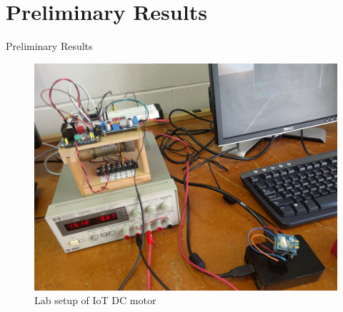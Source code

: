 \documentclass{beamer}
\begin{document}
\section{Preliminary Results}
\begin{frame}{Preliminary Results}
\begin{figure}
\includegraphics[scale=0.05]{../figs/motorSetup.jpg}
\caption{Lab setup of IoT DC motor}
\end{figure}
\end{frame}
\end{document}
